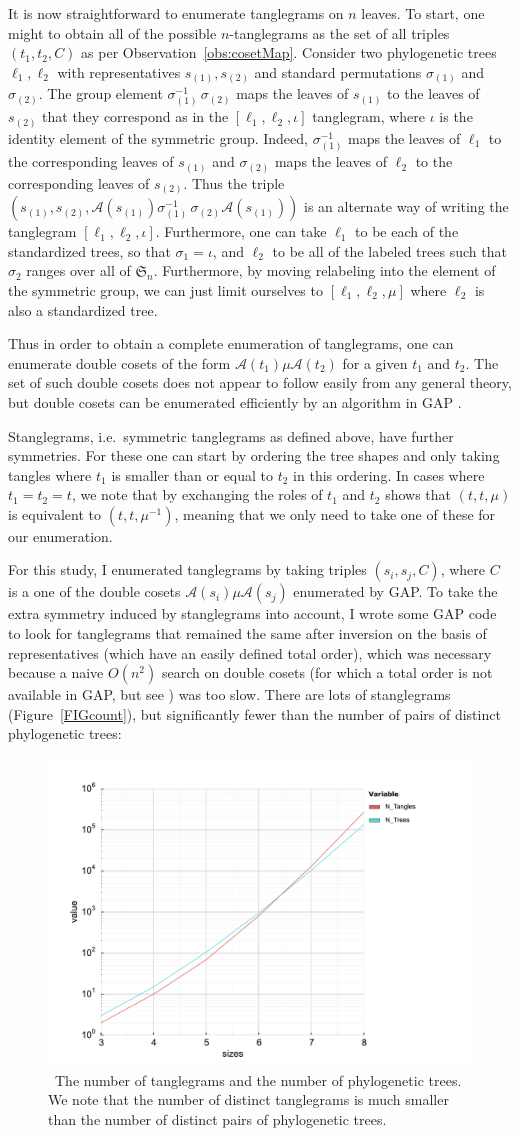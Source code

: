\documentclass{amsart}
\newcommand{\fS}{\mathfrak S}
\newcommand{\aut}{\mathcal A}
\newcommand{\pairing}{\mu}
\newcommand{\id}{\iota}
\newcommand{\arxiv}[1]{#1}
\newcommand{\FIGcount}{\
\label{FIGcount}
\begin{figure}
  \arxiv{\includegraphics[width=5in]{figures/count}}
\caption{\
  The number of tanglegrams and the number of phylogenetic trees.
  We note that the number of distinct tanglegrams is much smaller than the number of distinct pairs of phylogenetic trees.
}
\end{figure}
}
\begin{document}
It is now straightforward to enumerate tanglegrams on $n$ leaves.
To start, one might to obtain all of the possible $n$-tanglegrams as the set of all triples $(t_1, t_2, C)$ as per Observation~\ref{obs:cosetMap}.
Consider two phylogenetic trees $\ell_1, \ell_2$ with representatives $s_{(1)}, s_{(2)}$ and standard permutations $\sigma_{(1)}$ and $\sigma_{(2)}$.
The group element $\sigma_{(1)}^{-1} \, \sigma_{(2)}$ maps the leaves of $s_{(1)}$ to the leaves of $s_{(2)}$ that they correspond as in the $[\ell_1, \ell_2, \id]$ tanglegram, where $\id$ is the identity element of the symmetric group.
Indeed, $\sigma_{(1)}^{-1}$ maps the leaves of $\ell_1$ to the corresponding leaves of $s_{(1)}$ and $\sigma_{(2)}$ maps the leaves of $\ell_2$ to the corresponding leaves of $s_{(2)}$.
Thus the triple $(s_{(1)}, s_{(2)}, \aut(s_{(1)}) \sigma_{(1)}^{-1} \, \sigma_{(2)} \aut(s_{(1)}))$ is an alternate way of writing the tanglegram $[\ell_1, \ell_2, \id]$.
Furthermore, one can take $\ell_1$ to be each of the standardized trees, so that $\sigma_1 = \id$, and $\ell_2$ to be all of the labeled trees such that $\sigma_2$ ranges over all of $\fS_n$.
Furthermore, by moving relabeling into the element of the symmetric group, we can just limit ourselves to $[\ell_1, \ell_2, \pairing]$ where $\ell_2$ is also a standardized tree.

Thus in order to obtain a complete enumeration of tanglegrams, one can enumerate double cosets of the form $\aut(t_1) \pairing \aut(t_2)$ for a given $t_1$ and $t_2$.
The set of such double cosets does not appear to follow easily from any general theory, but double cosets can be enumerated efficiently by an algorithm in GAP \cite{GAP4}.

Stanglegrams, i.e.\ symmetric tanglegrams as defined above, have further symmetries.
For these one can start by ordering the tree shapes and only taking tangles where $t_1$ is smaller than or equal to $t_2$ in this ordering.
In cases where $t_1 = t_2 = t$, we note that by exchanging the roles of $t_1$ and $t_2$ shows that $(t, t, \mu)$ is equivalent to $(t, t, \mu^{-1})$, meaning that we only need to take one of these for our enumeration.

For this study, I enumerated tanglegrams by taking triples $(s_i, s_j, C)$, where $C$ is a one of the double cosets $\aut(s_i) \pairing \aut(s_j)$ enumerated by GAP.
To take the extra symmetry induced by stanglegrams into account, I wrote some GAP code to look for tanglegrams that remained the same after inversion on the basis of representatives (which have an easily defined total order), which was necessary because a naive $O(n^2)$ search on double cosets (for which a total order is not available in GAP, but see \cite{Hulpke2003-em}) was too slow.
There are lots of stanglegrams (Figure~\ref{FIGcount}), but significantly fewer than the number of pairs of distinct phylogenetic trees:
\FIGcount
\end{document}
